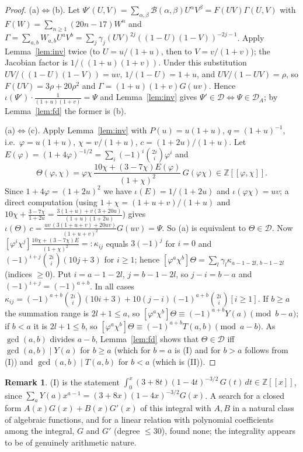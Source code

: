 \documentclass[11pt]{amsart}
\theoremstyle{definition}
\newtheorem{remark}[theorem]{Remark}
\newcommand{\Z}{\mathbb{Z}}
\newcommand{\Der}{\mathcal{D}}
\begin{document}
\begin{proof}
(a)$\Leftrightarrow$(b). Let $\Psi'(U,V)=\sum_{\alpha,\beta}\mathcal B(\alpha,\beta)U^\alpha V^\beta
=F(UV)\Gamma(U,V)$ with $F(W)=\sum_{n\ge1}(20n-17)W^n$ and
$\Gamma=\sum_{a,b}W_{a,b}U^aV^b=\sum_j\gamma_j(UV)^{2j}((1-U)(1-V))^{-2j-1}$. Apply
Lemma~\ref{lem:inv} twice (to $U=u/(1+u)$, then to $V=v/(1+v)$); the Jacobian factor is
$1/((1+u)(1+v))$. Under this substitution $UV/((1-U)(1-V))=uv$, $1/(1-U)=1+u$, and
$UV/(1-UV)=\rho$, so $F(UV)=3\rho+20\rho^2$ and $\Gamma=(1+u)(1+v)G(uv)$. Hence
$\iota(\Psi')\cdot\frac1{(1+u)(1+v)}=\Psi$ and Lemma~\ref{lem:inv} gives
$\Psi'\in\Der\iff\Psi\in\Der_A$; by Lemma~\ref{lem:fd} the former is (b).

(a)$\Leftrightarrow$(c). Apply Lemma~\ref{lem:inv} with $P(u)=u(1+u)$, $q=(1+u)^{-1}$, i.e.\
$\varphi=u(1+u)$, $\chi=v/(1+u)$, $c=(1+2u)/(1+u)$. Let $E(\varphi)=(1+4\varphi)^{-1/2}
=\sum_i(-1)^i\binom{2i}i\varphi^i$ and
\[
\Theta(\varphi,\chi)=\varphi\chi\,\frac{10\chi+(3-7\chi)E(\varphi)}{(1+\chi)^2}\,G(\varphi\chi)
\in\Z[[\varphi,\chi]].
\]
Since $1+4\varphi=(1+2u)^2$ we have $\iota(E)=1/(1+2u)$ and $\iota(\varphi\chi)=uv$; a direct
computation (using $1+\chi=(1+u+v)/(1+u)$ and
$10\chi+\frac{3-7\chi}{1+2u}=\frac{3(1+u)+v(3+20u)}{(1+u)(1+2u)}$) gives
$\iota(\Theta)\,c=\frac{uv\,(3(1+u+v)+20uv)}{(1+u+v)^2}G(uv)=\Psi$. So (a) is equivalent to
$\Theta\in\Der$. Now
$[\varphi^i\chi^j]\frac{10\chi+(3-7\chi)E}{(1+\chi)^2}=:\kappa_{ij}$ equals $3(-1)^j$ for $i=0$ and
$(-1)^{i+j}\binom{2i}i(10j+3)$ for $i\ge1$; hence
$[\varphi^a\chi^b]\Theta=\sum_l\gamma_l\kappa_{a-1-2l,\,b-1-2l}$ (indices $\ge0$). Put $i=a-1-2l$,
$j=b-1-2l$, so $j-i=b-a$ and $(-1)^{i+j}=(-1)^{a+b}$. In all cases
$\kappa_{ij}=(-1)^{a+b}\binom{2i}i(10i+3)+10(j-i)(-1)^{a+b}\binom{2i}i[i\ge1]$. If $b\ge a$ the
summation range is $2l+1\le a$, so $[\varphi^a\chi^b]\Theta\equiv(-1)^{a+b}Y(a)\pmod{b-a}$; if
$b<a$ it is $2l+1\le b$, so $[\varphi^a\chi^b]\Theta\equiv(-1)^{a+b}T(a,b)\pmod{a-b}$. As
$\gcd(a,b)$ divides $a-b$, Lemma~\ref{lem:fd} shows that $\Theta\in\Der$ iff $\gcd(a,b)\mid Y(a)$
for $b\ge a$ (which for $b=a$ is (I) and for $b>a$ follows from (I)) and $\gcd(a,b)\mid T(a,b)$
for $b<a$ (which is (II)).
\end{proof}

\begin{remark}
(I) is the statement $\int_0^x(3+8t)(1-4t)^{-3/2}\,G(t)\,dt\in\Z[[x]]$, since
$\sum_aY(a)x^{a-1}=(3+8x)(1-4x)^{-3/2}G(x)$. A search for a closed form
$A(x)G(x)+B(x)G'(x)$ of this integral with $A,B$ in a natural class of algebraic functions, and for a
linear relation with polynomial coefficients among the integral, $G$ and $G'$ (degree $\le30$),
found none; the integrality appears to be of genuinely arithmetic nature.
\end{remark}
\end{document}

